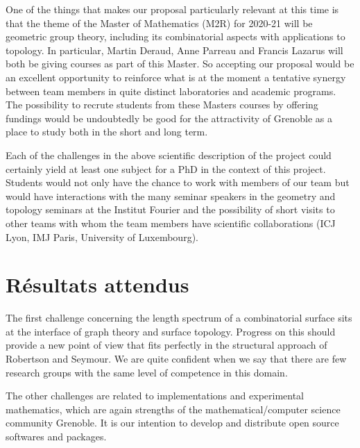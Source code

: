 \documentclass[14pt,fleqn]{article}
\begin{document}
\vspace{.25in}



One of the things that makes
our proposal particularly relevant
at this time is that
the theme of the  Master of
Mathematics (M2R) for 2020-21
will be  geometric group theory, 
including its combinatorial aspects with applications to topology. 
In particular, Martin Deraud, Anne Parreau and Francis Lazarus will both be giving courses as part of  this Master. 
So accepting our proposal 
would be  an excellent opportunity 
to reinforce
what is at the moment a tentative synergy 
between team members in
quite distinct laboratories and
academic programs. 
The possibility to recrute 
students from these Masters courses
by offering fundings 
would be undoubtedly 
be good for the attractivity
of Grenoble as a place to study
both in the short and long term. 

Each of the challenges  in the above scientific description of the project
could certainly yield 
at least one subject for a PhD
in the context of this project.
Students would not only have the chance
to work with members of our team 
but would have interactions with
the  many seminar speakers 
in the geometry and topology seminars 
at the Institut Fourier
and the possibility of short visits
to other teams with whom the team members
have scientific collaborations
(ICJ Lyon, IMJ Paris, University of Luxembourg).




\section{Résultats attendus}

The first challenge concerning the length spectrum of a combinatorial surface sits at the interface of graph theory and surface topology. Progress on this should provide a new point of view that fits perfectly in the structural approach of Robertson and Seymour. We are quite confident when we say  that there are few research groups with the same level of competence  in this domain.

The other challenges are related to implementations and experimental mathematics, 
which are again strengths of the 
mathematical/computer science community Grenoble. 
It is our intention to develop and distribute open source softwares and packages.
\end{document}
